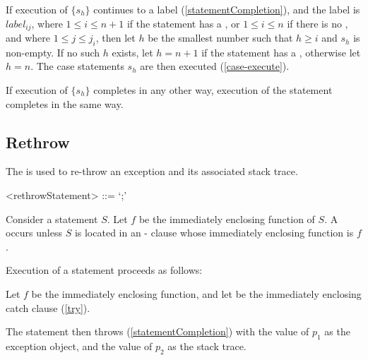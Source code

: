 \documentclass[makeidx]{article}
\begin{document}
If execution of $\{s_h\}$ continues to a label
(\ref{statementCompletion}),
and the label is $label_{ij}$,
where $1 \le i \le n+1$ if the \SWITCH{} statement has a \DEFAULT,
or $1 \le i \le n$ if there is no \DEFAULT,
and where $1 \le j \le j_{i}$,
then let $h$ be the smallest number such that $h \ge i$ and $s_h$ is non-empty.
If no such $h$ exists,
let $h = n + 1$ if the \SWITCH{} statement has a \DEFAULT,
otherwise let $h = n$.
The case statements $s_h$ are then executed (\ref{case-execute}).

If execution of $\{s_h\}$ completes in any other way,
execution of the \SWITCH{} statement completes in the same way.


\subsection{Rethrow}

\LMHash{}%
The  is used to
re-throw an exception and its associated stack trace.

\begin{grammar}
<rethrowStatement> ::= \RETHROW{} `;'
\end{grammar}

\LMHash{}%
Consider a \RETHROW{} statement $S$.
Let $f$ be the immediately enclosing function of $S$.
A  occurs unless $S$ is located in
an \ON-\CATCH{} clause whose immediately enclosing function is $f$.

\LMHash{}%
Execution of a \code{\RETHROW} statement proceeds as follows:

\LMHash{}%
Let $f$ be the immediately enclosing function,
and let 
be the immediately enclosing catch clause (\ref{try}).


\LMHash{}%
The \RETHROW{} statement then throws (\ref{statementCompletion})
with the value of $p_1$ as the exception object,
and the value of $p_2$ as the stack trace.
\end{document}
